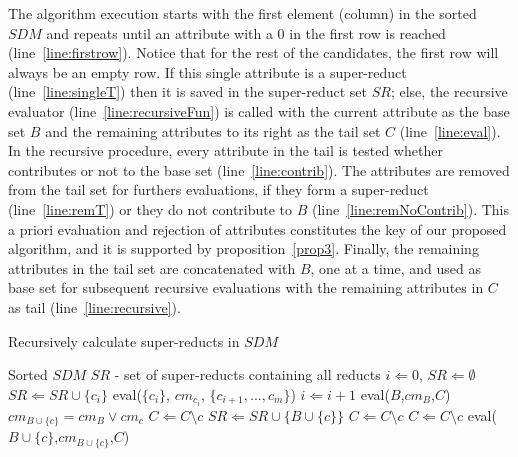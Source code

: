 \documentclass[authoryear,11pt]{elsarticle}
\begin{document}
		The algorithm execution starts with the first element (column) in the sorted $SDM$ and repeats until an 
	attribute with a 0 in the first row is reached (line~\ref{line:firstrow}). Notice that for the rest of the
	candidates, the first row will always be an empty row. If this single attribute is a super-reduct
	(line~\ref{line:singleT}) then it is saved in the super-reduct set $SR$; else, the recursive evaluator 
	(line~\ref{line:recursiveFun}) is called with the current attribute as the base set $B$ and the remaining 
	attributes to its right as the tail set $C$ (line~\ref{line:eval}).
	In the recursive procedure, every attribute in the tail is tested whether contributes or not to the base set 
	(line~\ref{line:contrib}). The attributes are removed from the tail set for furthers evaluations, if they 
	form a super-reduct (line~\ref{line:remT}) or they do not contribute to $B$ (line~\ref{line:remNoContrib}).
	This a priori evaluation and rejection of attributes constitutes the key of our proposed algorithm, and it 
	is supported by proposition~\ref{prop3}.
	Finally, the remaining attributes in the tail set are concatenated with $B$, one at a time, and used as base 
	set for subsequent recursive evaluations with the remaining attributes in $C$ as tail
	(line~\ref{line:recursive}).
	
	\renewcommand{\algorithmicrequire}{\textbf{Input:}}
	\renewcommand{\algorithmicensure}{\textbf{Output:}}
	\begin{algorithm}
	\caption{Recursively calculate super-reducts in $SDM$}
	\label{alg:RSDM}
	\begin{algorithmic}[1]
	  \Require Sorted $SDM$
      \Ensure $SR$ - set of super-reducts containing all reducts
	  \State $i \Leftarrow 0$, $SR \Leftarrow \emptyset$
	  \label{line:firstrow}
	  	\label{line:singleT}
	  		\State $SR \Leftarrow SR\cup \lbrace c_i \rbrace$
	  	\Else
	  		\State eval($\lbrace c_i \rbrace$, $cm_{c_i}$, $\lbrace c_{i+1},..., c_m\rbrace$)\label{line:eval}
	  	\EndIf
	  	\State $i \Leftarrow i+1$
	  \EndWhile
	  \State eval($B$,$cm_B$,$C$)\label{line:recursiveFun}
	  	\State $cm_{B\cup \lbrace c\rbrace}=cm_B \vee cm_c$
	  	\label{line:contrib}
	  			\State $C \Leftarrow C\setminus c$\label{line:remT} 
	  			\State $SR \Leftarrow SR\cup\lbrace B\cup \lbrace c\rbrace \rbrace$
	  		\EndIf
	  	\Else
	  		\State $C \Leftarrow C\setminus c$\label{line:remNoContrib} 
	  	\EndIf
	  \EndFor
	  	\State $C \Leftarrow C\setminus c$
	  	\State eval($B\cup \lbrace c\rbrace$,$cm_{B\cup \lbrace c\rbrace}$,$C$)\label{line:recursive} 
	  \EndFor
	\end{algorithmic}
	\end{algorithm}
		
\end{document}
